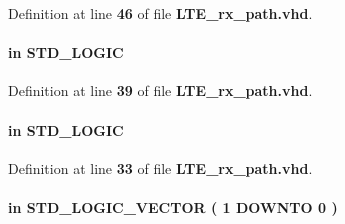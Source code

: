 Definition at line {\bf 46} of file {\bf L\+T\+E\+\_\+rx\+\_\+path.\+vhd}.

\paragraph[{pct\+\_\+clr\+\_\+detect}]{ {\bfseries \textcolor{keywordflow}{in}\textcolor{vhdlchar}{ }} {\bfseries \textcolor{comment}{S\+T\+D\+\_\+\+L\+O\+G\+IC}\textcolor{vhdlchar}{ }} \hspace{0.3cm}{\ttfamily [Port]}}\label{classLTE__rx__path_a9ee96ea3ecbb8146374ea32a6802423a}


Definition at line {\bf 39} of file {\bf L\+T\+E\+\_\+rx\+\_\+path.\+vhd}.

\paragraph[{reset}]{ {\bfseries \textcolor{keywordflow}{in}\textcolor{vhdlchar}{ }} {\bfseries \textcolor{comment}{S\+T\+D\+\_\+\+L\+O\+G\+IC}\textcolor{vhdlchar}{ }} \hspace{0.3cm}{\ttfamily [Port]}}\label{classLTE__rx__path_a199d3fe4aaa6850d129b06faf6c246d9}


Definition at line {\bf 33} of file {\bf L\+T\+E\+\_\+rx\+\_\+path.\+vhd}.

\paragraph[{smpl\+\_\+width}]{ {\bfseries \textcolor{keywordflow}{in}\textcolor{vhdlchar}{ }} {\bfseries \textcolor{comment}{S\+T\+D\+\_\+\+L\+O\+G\+I\+C\+\_\+\+V\+E\+C\+T\+OR}\textcolor{vhdlchar}{ }\textcolor{vhdlchar}{(}\textcolor{vhdlchar}{ }\textcolor{vhdlchar}{ } \textcolor{vhdldigit}{1} \textcolor{vhdlchar}{ }\textcolor{keywordflow}{D\+O\+W\+N\+TO}\textcolor{vhdlchar}{ }\textcolor{vhdlchar}{ } \textcolor{vhdldigit}{0} \textcolor{vhdlchar}{ }\textcolor{vhdlchar}{)}\textcolor{vhdlchar}{ }} \hspace{0.3cm}{\ttfamily [Port]}}\label{classLTE__rx__path_a5b9829b3913917b6b4442e2e6f5d90a4}



